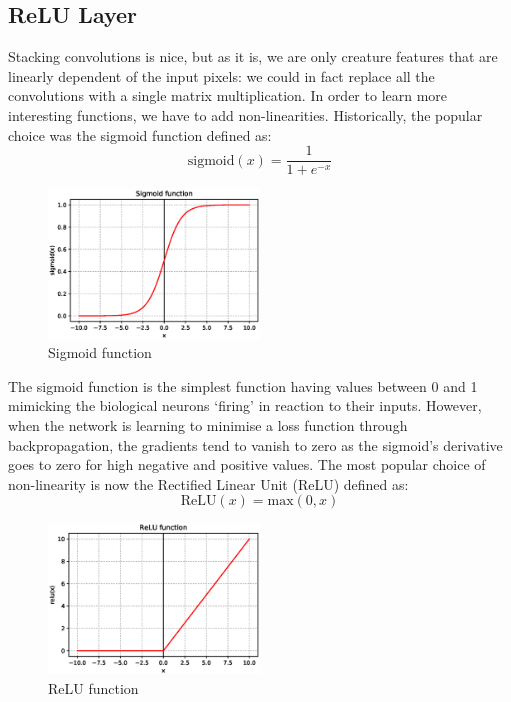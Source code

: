 \subsection{ReLU Layer}
Stacking convolutions is nice, but as it is, we are only creature features that are linearly dependent of the input pixels: we could in fact replace all the convolutions with a single matrix multiplication. In order to learn more interesting functions, we have to add non-linearities. Historically, the popular choice was the sigmoid function defined as:
\begin{equation}
\text{sigmoid}(x) = \frac{1}{1+e^{-x}}
\end{equation}

\begin{figure}[H]
\centering
\includegraphics[width=0.5\textwidth]{Images/sigmoid.eps}
\caption{Sigmoid function}
\end{figure}

The sigmoid function is the simplest function having values between 0 and 1 mimicking the biological neurons `firing' in reaction to their inputs. However, when the network is learning to minimise a loss function through backpropagation, the gradients tend to vanish to zero as the sigmoid's derivative goes to zero for high negative and positive values. The most popular choice of non-linearity is now the Rectified Linear Unit (ReLU) defined as:
\begin{equation}
\text{ReLU}(x) = \text{max}(0,x)
\end{equation}

\begin{figure}[H]
\centering
\includegraphics[width=0.5\textwidth]{Images/relu.eps}
\caption{ReLU function}
\end{figure}

